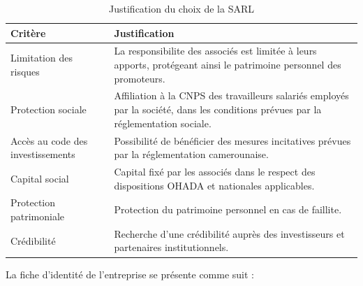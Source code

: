 \begin{table}[htbp]
    \centering
    \caption{Justification du choix de la SARL}
    \label{tab:choix_sarl}
    \renewcommand{\arraystretch}{1.5}
    \begin{tabularx}{\textwidth}{|>{\raggedright\arraybackslash}p{4cm}|X|}
        \hline
        \textbf{Critère} & \textbf{Justification} \\
        \hline
        Limitation des risques & La responsibilite des associés est limitée à leurs apports, protégeant ainsi le patrimoine personnel des promoteurs. \\
        \hline
        Protection sociale & Affiliation à la CNPS des travailleurs salariés employés par la société, dans les conditions prévues par la réglementation sociale. \\
        \hline
        Accès au code des investissements & Possibilité de bénéficier des mesures incitatives prévues par la réglementation camerounaise. \\
        \hline
        Capital social & Capital fixé par les associés dans le respect des dispositions OHADA et nationales applicables. \\
        \hline
        Protection patrimoniale & Protection du patrimoine personnel en cas de faillite. \\
        \hline
        Crédibilité & Recherche d'une crédibilité auprès des investisseurs et partenaires institutionnels. \\
        \hline
    \end{tabularx}
    \tablesourcepromoteurs
\end{table}
La fiche d'identité de l'entreprise se présente comme suit :
